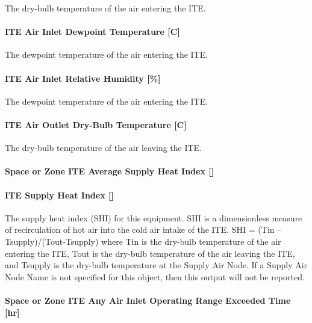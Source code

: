 The dry-bulb temperature of the air entering the ITE.

\paragraph{ITE Air Inlet Dewpoint Temperature {[}C{]}}\label{ite-air-inlet-dewpoint-temperature-c}

The dewpoint temperature of the air entering the ITE.

\paragraph{ITE Air Inlet Relative Humidity {[}\%{]}}\label{ite-air-inlet-relative-humidity}

The dewpoint temperature of the air entering the ITE.

\paragraph{ITE Air Outlet Dry-Bulb Temperature {[}C{]}}\label{ite-air-outlet-dry-bulb-temperature-c}

The dry-bulb temperature of the air leaving the ITE.

\paragraph{Space or Zone ITE Average Supply Heat Index {[]}}\label{zone-ite-average-supply-heat-index}

\paragraph{ITE Supply Heat Index {[]}}\label{ite-supply-heat-index}

The supply heat index (SHI) for this equipment. SHI is a dimensionless measure of recirculation of hot air into the cold air intake of the ITE. SHI = (Tin -- Tsupply)/(Tout-Tsupply) where Tin is the dry-bulb temperature of the air entering the ITE, Tout is the dry-bulb temperature of the air leaving the ITE, and Tsupply is the dry-bulb temperature at the Supply Air Node. If a Supply Air Node Name is not specified for this object, then this output will not be reported.

\paragraph{Space or Zone ITE Any Air Inlet Operating Range Exceeded Time {[}hr{]}}\label{zone-ite-any-air-inlet-operating-range-exceeded-time-hr}

